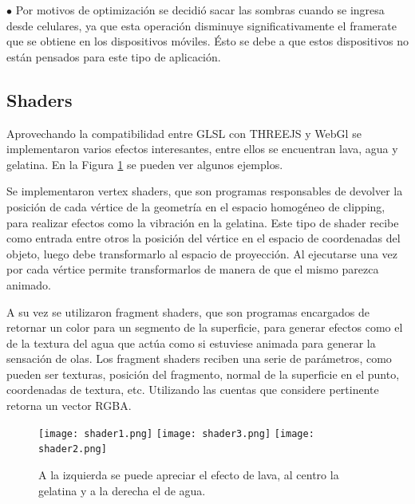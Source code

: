\documentclass[12pt]{article}
\begin{document}
$\bullet$ Por motivos de optimización se decidió sacar las sombras cuando se ingresa desde celulares, ya que esta operación disminuye significativamente el framerate que se obtiene en los dispositivos móviles. Ésto se debe a que estos dispositivos no están pensados para este tipo de aplicación.

\clearpage
\subsection{Shaders}
\noindent Aprovechando la compatibilidad entre GLSL con THREEJS y WebGl se implementaron varios efectos interesantes, entre ellos se encuentran lava, agua y gelatina. En la Figura \ref{shader} se pueden ver algunos ejemplos.

Se implementaron vertex shaders, que son programas responsables de devolver la posición de cada vértice de la geometría en el espacio homogéneo de clipping, para realizar efectos como la vibración en la gelatina. Este tipo de shader recibe como entrada entre otros la posición del vértice en el espacio de coordenadas del objeto, luego debe transformarlo al espacio de proyección. Al ejecutarse una vez por cada vértice permite transformarlos de manera de que el mismo parezca animado.

A su vez se utilizaron fragment shaders, que son programas encargados de retornar un color para un segmento de la superficie, para generar efectos como el de la textura del agua que actúa como si estuviese animada para generar la sensación de olas. Los fragment shaders reciben una serie de parámetros, como pueden ser texturas, posición del fragmento, normal de la superficie en el punto, coordenadas de textura, etc. Utilizando las cuentas que considere pertinente retorna un vector RGBA.

\begin{figure}[h!]
\texttt{[image: shader1.png]}
\hfill
\texttt{[image: shader3.png]}
\hfill
\texttt{[image: shader2.png]}
\caption{ A la izquierda se puede apreciar el efecto de lava, al centro la gelatina y a la derecha el de agua.}
\label{shader}
\end{figure}
\end{document}
